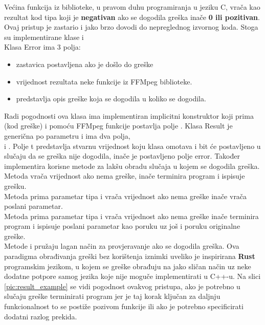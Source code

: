  \label{sec:result}
Većina funkcija iz biblioteke, u pravom duhu programiranja u jeziku C, vrača kao rezultat kod tipa  koji
je \textbf{negativan} ako se dogodila greška inače \textbf{0 ili pozitivan}. 
\\
Ovaj pristup je zastario i jako brzo dovodi do nepreglednog izvornog koda. Stoga su implementirane klase
 i  
\\
\paraBreak
Klasa Error ima 3 polja: 
\begin{itemize}
  \item {} zastavica postavljena ako je došlo do greške
  \item {} vrijednost rezultata neke funkcije iz FFMpeg biblioteke.
  \item {} predstavlja opis greške koja se dogodila u koliko se dogodila.
\end{itemize}
Radi pogodnosti ova klasa ima implementiran implicitni konstruktor koji prima  (kod greške) i pomoću
FFMpeg funkcije  postavlja polje .
\paraBreak
Klasa Result je generična po parametru  i ima dva polja, 
\\ 
 i . 
\paraBreak
Polje t predstavlja stvarnu vrijednost koju klasa omotava i bit će postavljeno u slučaju da se greška nije dogodila,
inače je postavljeno polje error.
\paraBreak
Također implementira korisne metode za lakšu obradu slučaja u kojem se dogodila greška. 
\\
Metoda  vrača vrijednost  ako nema greške, inače terminira program i ispisuje grešku. 
\\
Metoda  prima parametar tipa  i vrača vrijednost  ako nema greške inače vrača
poslani parametar. 
\\
Metoda  prima parametar tipa  i vrača vrijednost  ako nema greške
inače terminira program i ispisuje poslani parametar kao poruku uz još i poruku originalne greške. 
\\
Metode  i   pružaju lagan način za provjeravanje ako se dogodila greška.
\paraBreak
Ova paradigma obrađivanja greški bez korištenja iznimki uveliko je inspirirana \textbf{Rust} programskim jezikom, u kojem
se greške obrađuju na jako sličan način uz neke dodatne potpore samog jezika koje nije moguče implementirati u C++-u. \cite{rust}
\paraBreak
Na slici \ref{pic:result_example} se vidi pogodnost ovakvog pristupa, ako je potrebno u slučaju greške terminirati program
jer je taj korak ključan za daljnju funkcionalnost to se postiže pozivom funkcije  ili 
ako je potrebno specificirati dodatni razlog prekida.

